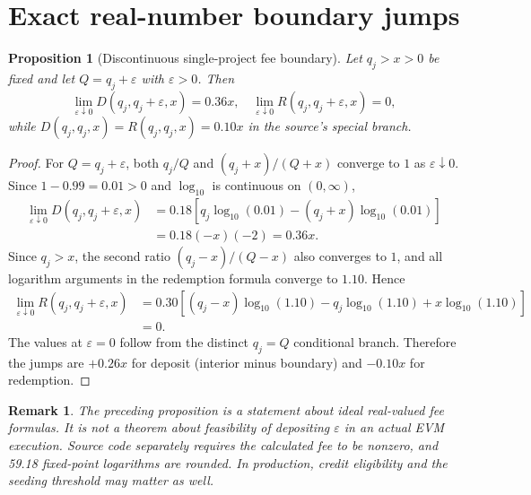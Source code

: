 \documentclass[11pt]{article}
\newtheorem{proposition}{Proposition}
\newtheorem{remark}{Remark}
\begin{document}
\section{Exact real-number boundary jumps}
\begin{proposition}[Discontinuous single-project fee boundary]
Let $q_j>x>0$ be fixed and let $Q=q_j+\varepsilon$ with $\varepsilon>0$. Then
\[
\lim_{\varepsilon\downarrow0}D(q_j,q_j+\varepsilon,x)=0.36x,\quad
\lim_{\varepsilon\downarrow0}R(q_j,q_j+\varepsilon,x)=0,
\]
while $D(q_j,q_j,x)=R(q_j,q_j,x)=0.10x$ in the source's special branch.
\end{proposition}
\begin{proof}
For $Q=q_j+\varepsilon$, both $q_j/Q$ and $(q_j+x)/(Q+x)$ converge to $1$ as $\varepsilon\downarrow0$. Since $1-0.99=0.01>0$ and $\log_{10}$ is continuous on $(0,\infty)$,
\begin{align*}
\lim_{\varepsilon\downarrow0}D(q_j,q_j+\varepsilon,x)
&=0.18\left[q_j\log_{10}(0.01)-(q_j+x)\log_{10}(0.01)\right]\\
&=0.18(-x)(-2)=0.36x.
\end{align*}
Since $q_j>x$, the second ratio $(q_j-x)/(Q-x)$ also converges to $1$, and all logarithm arguments in the redemption formula converge to $1.10$. Hence
\begin{align*}
\lim_{\varepsilon\downarrow0}R(q_j,q_j+\varepsilon,x)
&=0.30\left[(q_j-x)\log_{10}(1.10)-q_j\log_{10}(1.10)+x\log_{10}(1.10)\right]\\
&=0.
\end{align*}
The values at $\varepsilon=0$ follow from the distinct $q_j=Q$ conditional branch. Therefore the jumps are $+0.26x$ for deposit (interior minus boundary) and $-0.10x$ for redemption.
\end{proof}

\begin{remark}
The preceding proposition is a statement about ideal real-valued fee formulas. It is not a theorem about feasibility of depositing $\varepsilon$ in an actual EVM execution. Source code separately requires the calculated fee to be nonzero, and 59.18 fixed-point logarithms are rounded. In production, credit eligibility and the seeding threshold may matter as well.
\end{remark}
\end{document}
